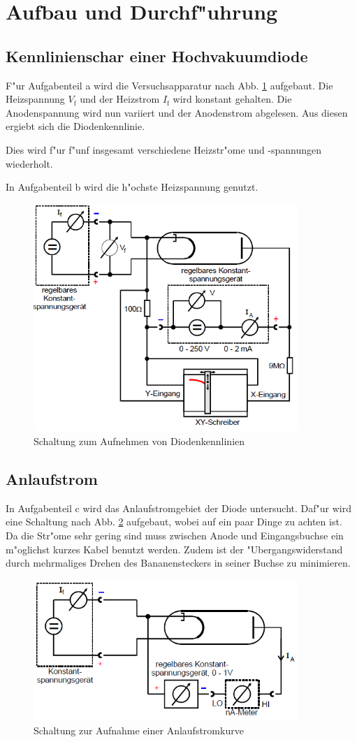 \section{Aufbau und Durchf"uhrung}
	\label{sec:durchfuehrung}

\subsection{Kennlinienschar einer Hochvakuumdiode} %
\label{sub:subsection_name}

F"ur Aufgabenteil a wird die Versuchsapparatur nach Abb. \ref{aufgabe_a} aufgebaut.
Die Heizspannung $V_\mathrm{f}$ und der Heizstrom $I_\mathrm{f}$ wird konstant gehalten.
Die Anodenspannung wird nun variiert und der Anodenstrom abgelesen.
Aus diesen ergiebt sich die Diodenkennlinie.

Dies wird f"ur f"unf insgesamt verschiedene Heizstr"ome und -spannungen wiederholt.

In Aufgabenteil b wird die h"ochste Heizspannung genutzt.


\begin{figure}[!h]
	\centering
	\includegraphics[width = 10cm]{img/aufgabea.PNG}
	\caption{Schaltung zum Aufnehmen von Diodenkennlinien}
	\label{aufgabe_a}
\end{figure}

\subsection{Anlaufstrom} %
\label{sub:anlaufstrom}

In Aufgabenteil c wird das Anlaufstromgebiet der Diode untersucht.
Daf"ur wird eine Schaltung nach Abb. \ref{aufgabe_c} aufgebaut, wobei auf ein paar Dinge zu achten ist.
Da die Str"ome sehr gering sind muss zwischen Anode und Eingangsbuchse ein m"oglichst kurzes Kabel benutzt werden.
Zudem ist der "Ubergangswiderstand durch mehrmaliges Drehen des Bananensteckers in seiner Buchse zu minimieren.

\begin{figure}[!h]
	\centering
	\includegraphics[width = 10cm]{img/aufgabec.PNG}
	\caption{Schaltung zur Aufnahme einer Anlaufstromkurve}
	\label{aufgabe_c}
\end{figure}
